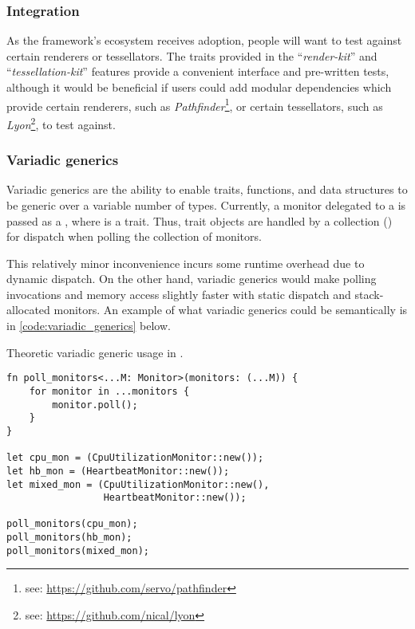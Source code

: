 \subsubsection{Integration}
As the framework's ecosystem receives adoption, people will want to test against certain renderers or tessellators. The traits provided in the ``\textit{render-kit}'' and ``\textit{tessellation-kit}'' features provide a convenient interface and pre-written tests, although it would be beneficial if users could add modular dependencies which provide certain renderers, such as \textit{Pathfinder}\footnote{see: \href{https://github.com/servo/pathfinder}{https://github.com/servo/pathfinder}}, or certain tessellators, such as \textit{Lyon}\footnote{see: \href{https://github.com/nical/lyon}{https://github.com/nical/lyon}}, to test against.

\subsubsection{Variadic generics}
Variadic generics are the ability to enable traits, functions, and data structures to be generic over a variable number of types. Currently, a monitor delegated to a  is passed as a , where  is a trait. Thus, trait objects are handled by a collection () for dispatch when polling the collection of monitors.\medskip

This relatively minor inconvenience incurs some runtime overhead due to dynamic dispatch. On the other hand, variadic generics would make polling invocations and memory access slightly faster with static dispatch and stack-allocated monitors. An example of what variadic generics could be semantically is in \cref{code:variadic_generics} below.

\begin{snippet}
\caption{Theoretic variadic generic usage in \toolname.}\label{code:variadic_generics}
\begin{verbatim}
fn poll_monitors<...M: Monitor>(monitors: (...M)) {
    for monitor in ...monitors {
        monitor.poll();
    }
}

let cpu_mon = (CpuUtilizationMonitor::new());
let hb_mon = (HeartbeatMonitor::new());
let mixed_mon = (CpuUtilizationMonitor::new(), 
                 HeartbeatMonitor::new());

poll_monitors(cpu_mon);
poll_monitors(hb_mon);
poll_monitors(mixed_mon);
\end{verbatim}
\end{snippet}
\medskip

